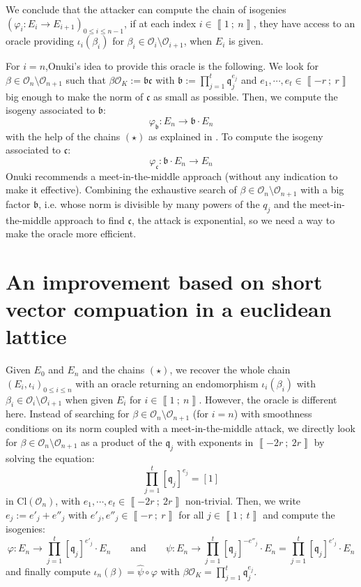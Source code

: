 \documentclass[a4paper,10pt]{article}
\theoremstyle{definition}
\theoremstyle{plain}
\theoremstyle{definition}
\newcommand{\mO}{\mathcal{O}}
\renewcommand{\i}[2]{\left\llbracket #1~;~#2\right\rrbracket}
\renewcommand{\(}{\left(}
\renewcommand{\)}{\right)}
\newcommand{\mf}[1]{\mathfrak{#1}}
\begin{document}
We conclude that the attacker can compute the chain of isogenies $(\varphi_i : E_i\longrightarrow E_{i+1})_{0\leq i\leq n-1}$, if at each index $i\in\i{1}{n}$,  they have access to an oracle providing $\iota_i(\beta_i)$ for $\beta_i\in\mO_i\setminus\mO_{i+1}$, when $E_{i}$ is given. 

For $i=n$,Onuki's idea to provide this oracle is the following.  We look for $\beta\in\mO_n\setminus\mO_{n+1}$ such that $\beta\mO_K:=\mf{b}\mf{c}$ with $\mf{b}:=\prod_{j=1}^t\mf{q}_j^{e_j}$ and $e_1, \cdots, e_t\in\i{-r}{r}$ big enough to make the norm of $\mf{c}$ as small as possible. Then, we compute the isogeny associated to $\mf{b}$:
\[\varphi_{\mf{b}}: E_n\longrightarrow \mf{b}\cdot E_n\]
with the help of the chains $(\star)$ as explained in \cite[§ 5.2]{OSIDH}. To compute the isogeny associated to $\mf{c}$:
\[\varphi_{\mf{c}}: \mf{b}\cdot E_n\longrightarrow E_n\]
Onuki recommends a meet-in-the-middle approach (without any indication to make it effective). Combining the exhaustive search of $\beta\in \mO_n\setminus\mO_{n+1}$ with a big factor $\mf{b}$, i.e. whose norm is divisible by many powers of the $q_j$ and the meet-in-the-middle approach to find $\mf{c}$, the attack is exponential, so we need a way to make the oracle more efficient.


\section{An improvement based on short vector compuation in a euclidean lattice}

Given $E_0$ and $E_n$ and the chains $(\star)$, we recover the whole chain $(E_i,\iota_i)_{0\leq i\leq n}$ with an oracle returning an endomorphism $\iota_i(\beta_i)$ with $\beta_i\in\mO_i\setminus\mO_{i+1}$ when given $E_i$ for $i\in\i{1}{n}$. However, the oracle is different here.  Instead of searching for $\beta\in\mO_n\setminus\mO_{n+1}$ (for $i=n$) with smoothness conditions on its norm coupled with a meet-in-the-middle attack, we directly look for $\beta\in\mO_n\setminus\mO_{n+1}$ as a product of the $\mf{q}_j$ with exponents in $\i{-2r}{2r}$ by solving the equation:
\[\prod_{j=1}^t[\mf{q}_j]^{e_j}=[1]\]
in $\mbox{Cl}(\mO_n)$, with $e_1,\cdots, e_t\in\i{-2r}{2r}$ non-trivial.  Then, we write $e_j:=e'_j+e''_j$ with $e'_j,e''_j\in\i{-r}{r}$ for all $j\in\i{1}{t}$ and compute the isogenies:
\[\varphi : E_n \longrightarrow \prod_{j=1}^t[\mf{q}_j]^{e'_j}\cdot E_n \qquad \mbox{and} \qquad \psi : E_n  \longrightarrow  \prod_{j=1}^t[\mf{q}_j]^{-e''_j}\cdot E_n=\prod_{j=1}^t[\mf{q}_j]^{e'_j}\cdot E_n\]
and finally compute $\iota_n(\beta)=\hat{\psi}\circ\varphi$ with $\beta\mO_K= \prod_{j=1}^t\mf{q}_j^{e_j}$.
\end{document}
